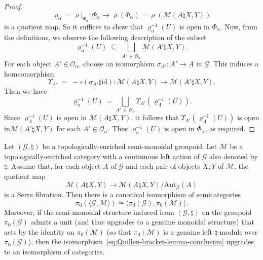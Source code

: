 \documentclass[AHL,Unicode,published]{cedram}
\newcommand{\Aut}{\mathrm{Aut}}
\newcommand{\id}{\mathrm{id}}
\newcommand{\cG}{\mathcal{G}}
\newcommand{\cM}{\mathcal{M}}
\newcommand{\cO}{\mathcal{O}}
\newcommand{\too}{\ensuremath{\longrightarrow}}
\begin{document}
\begin{proof}
\[
\varrho_{\alpha} = \varrho|_{\Phi_{\alpha}} \colon \Phi_{\alpha} \too \varrho(\Phi_{\alpha}) = \varrho(\cM(A\natural X,Y))
\]
is a quotient map. So it suffices to show that $\varrho_{\alpha}^{-1}(U)$ is open in $\Phi_{\alpha}$. Now, from the definitions, we observe the following description of the subset
\[
\varrho_{\alpha}^{-1}(U) \;\subseteq\; \bigsqcup_{A'\,\in\,\cO_{\alpha}} \cM(A'\natural X,Y).
\]
For each object $A' \in \cO_{\alpha}$, choose an isomorphism $\sigma_{A'} \colon A' \to A$ in $\cG$. This induces a homeomorphism
\[
\Upsilon_{A'} \;=\; -\circ (\sigma_{A'} \natural \id) \colon \cM(A\natural X,Y) \too \cM(A'\natural X,Y).
\]
Then we have
\[
\varrho_{\alpha}^{-1}(U) \;=\! \bigsqcup_{A'\,\in\,\cO_{\alpha}} \Upsilon_{A'}\left(\varrho_A^{-1}(U)\right).
\]
Since $\varrho_A^{-1}(U)$ is open in $\cM(A\natural X,Y)$, it follows that $\Upsilon_{A'}(\varrho_A^{-1}(U))$ is open in\newline $\cM(A'\natural X,Y)$ for each $A' \in \cO_{\alpha}$. Thus $\varrho_{\alpha}^{-1}(U)$ is open in $\Phi_{\alpha}$, as required.
\end{proof}

\begin{prop}\label{prop:topological-Quillen_morphisms}
Let $(\cG,\natural)$ be a topologically-enriched semi-monoidal grou\-poid. Let $\cM$ be a topologically-enriched category with a continuous left action of $\cG$ also denoted by $\natural$. Assume that, for each object $A$ of $\cG$ and each pair of objects $X,Y$ of $\cM$, the quotient map
\begin{equation}\label{eq:Quillen-bracket-lemma-condition}
\cM(A \natural X,Y) \too \cM(A \natural X,Y) / \Aut_{\cG}(A)
\end{equation}
is a Serre fibration. Then there is a canonical isomorphism of semicategories
\begin{equation}\label{eq:Quillen-bracket-lemma-conclusion}
\pi_{0}(\langle \cG,\cM \rangle) \cong \langle \pi_{0}(\cG),\pi_{0}(\cM) \rangle.
\end{equation}
Moreover, if the semi-monoidal structure induced from $(\cG,\natural)$ on the groupoid $\pi_{0}(\cG)$ admits a unit (and thus upgrades to a genuine monoidal structure) that acts by the identity on $\pi_{0}(\cM)$ (so that $\pi_{0}(\cM)$ is a genuine left $\natural$-module over $\pi_{0}(\cG)$), then the isomorphism~\eqref{eq:Quillen-bracket-lemma-conclusion} upgrades to an isomorphism of categories.
\end{prop}
\end{document}
